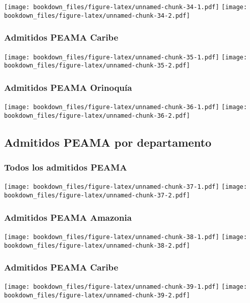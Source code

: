 \documentclass[]{article}
\theoremstyle{definition}
\theoremstyle{definition}
\theoremstyle{definition}
\theoremstyle{remark}
\begin{document}
\texttt{[image: bookdown\_files/figure-latex/unnamed-chunk-34-1.pdf]}
\texttt{[image: bookdown\_files/figure-latex/unnamed-chunk-34-2.pdf]}

\subsubsection{Admitidos PEAMA Caribe}\label{admitidos-peama-caribe}

\texttt{[image: bookdown\_files/figure-latex/unnamed-chunk-35-1.pdf]}
\texttt{[image: bookdown\_files/figure-latex/unnamed-chunk-35-2.pdf]}

\subsubsection{Admitidos PEAMA
Orinoquía}\label{admitidos-peama-orinoquia}

\texttt{[image: bookdown\_files/figure-latex/unnamed-chunk-36-1.pdf]}
\texttt{[image: bookdown\_files/figure-latex/unnamed-chunk-36-2.pdf]}

\subsection{Admitidos PEAMA por
departamento}\label{admitidos-peama-por-departamento}

\subsubsection{Todos los admitidos
PEAMA}\label{todos-los-admitidos-peama-1}

\texttt{[image: bookdown\_files/figure-latex/unnamed-chunk-37-1.pdf]}
\texttt{[image: bookdown\_files/figure-latex/unnamed-chunk-37-2.pdf]}

\subsubsection{Admitidos PEAMA
Amazonia}\label{admitidos-peama-amazonia-1}

\texttt{[image: bookdown\_files/figure-latex/unnamed-chunk-38-1.pdf]}
\texttt{[image: bookdown\_files/figure-latex/unnamed-chunk-38-2.pdf]}

\subsubsection{Admitidos PEAMA Caribe}\label{admitidos-peama-caribe-1}

\texttt{[image: bookdown\_files/figure-latex/unnamed-chunk-39-1.pdf]}
\texttt{[image: bookdown\_files/figure-latex/unnamed-chunk-39-2.pdf]}
\end{document}
